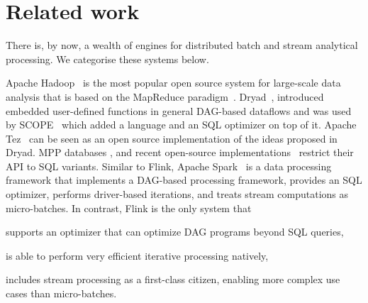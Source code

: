 
\section{Related work}
\label{sec:related}
There is, by now, a wealth of engines for distributed batch and stream analytical processing. We categorise these systems below. 

 Apache Hadoop~\cite{CUSTOM:web/Hadoop} is the most popular open source system for large-scale data analysis that is based on the MapReduce paradigm~\cite{DBLP:journals/cacm/DeanG08}. Dryad~\cite{isard2007dryad}, introduced embedded user-defined functions in general DAG-based dataflows and was used by SCOPE~\cite{scopeOptimizer} which added a language and an SQL optimizer on top of it. Apache Tez~\cite{CUSTOM:web/Tez} can be seen as an open source implementation of the ideas proposed in Dryad. MPP databases \cite{dewitt1990gamma} , and recent open-source implementations~\cite{CUSTOM:web/Drill,kornacker2015impala} restrict their API to SQL variants. Similar to Flink, Apache Spark~\cite{CUSTOM:web/Spark} is a data processing framework that implements a DAG-based processing framework, provides an SQL optimizer, performs driver-based iterations, and treats stream computations as micro-batches. In contrast, Flink is the only system that 
\begin{inparaenum}[i)]
  \item supports an optimizer that can optimize DAG programs beyond SQL queries,
  \item is able to perform very efficient iterative processing natively,
  \item includes stream processing as a first-class citizen, enabling more complex use cases than micro-batches.
\end{inparaenum}

